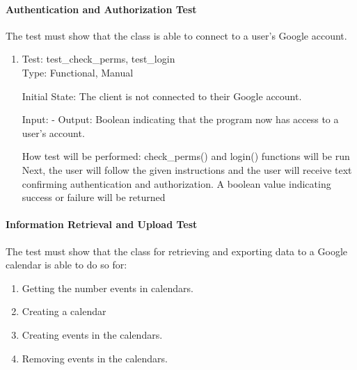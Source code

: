 \documentclass[12pt, titlepage]{article}
\begin{document}
\paragraph{Authentication and Authorization Test}
The test must show that the class is able to connect to a user's Google account.
\begin{enumerate}

\color{blue}\item{Test: test\_check\_perms, test\_login\\}
\color{black}
Type: Functional, Manual
					
Initial State: The client is not connected to their Google account. 
					
Input: - 
\color{blue}					
Output: Boolean indicating that the program now has access to a user's account.
					
How test will be performed: check\_perms() and login() functions will be run
Next, the user will follow the given instructions and the user will receive text confirming authentication and authorization. A boolean value indicating success or failure will be returned
\end{enumerate}
\color{black}
\paragraph{Information Retrieval and Upload Test}

The test must show that the class for retrieving and exporting data to a Google calendar is able to do so for:
\begin{enumerate}
    \item Getting the number events in calendars.
    \item Creating a calendar
    \item Creating events in the calendars.
    \item Removing events in the calendars.
\end{enumerate}
\end{document}
